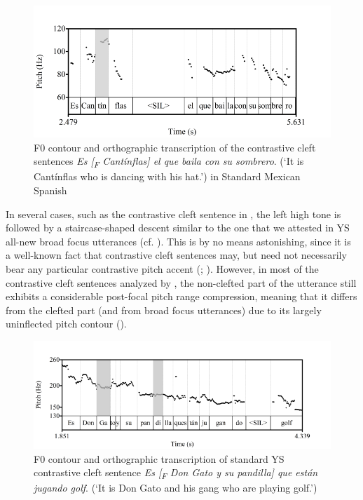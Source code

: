 \documentclass[output=paper]{langsci/langscibook}
\begin{document}
\begin{figure}
\includegraphics[width=\textwidth]{figures/UTH-img32.png}
 \caption{F0 contour and orthographic transcription of the contrastive cleft sentences 
 \textit{Es [\textsubscript{F} Cantínflas] el que baila con su sombrero}. 
 (‘It is Cantínflas who is dancing with his hat.’) in Standard Mexican Spanish}
\label{fig:uth:10}
\end{figure}

In several cases, such as the contrastive cleft sentence in , the left high tone is followed by a staircase-shaped descent similar to the one that we attested in YS all-new broad focus utterances (cf. \citealt{Uth16}). This is by no means astonishing, since it is a well-known fact that contrastive cleft sentences may, but need not necessarily bear any particular contrastive pitch accent (\citealt[15]{FeldhausenVanrell2015}; \citealt[4298]{MorenoCabrera99}). However, in most of the contrastive cleft sentences analyzed by \citet{Uth16}, the non-clefted part of the utterance still exhibits a considerable post-focal pitch range compression, meaning that it differs from the clefted part (and from broad focus utterances) due to its largely uninflected pitch contour ().

  

\begin{figure}
\includegraphics[width=\textwidth]{figures/UTH-img33.png}
 \caption{F0 contour and orthographic transcription of standard YS contrastive cleft sentence 
 \textit{Es [\textsubscript{F} Don Gato y su pandilla] que están jugando golf}. 
 (‘It is Don Gato and his gang who are playing golf.')}
\label{fig:uth:11}
\end{figure}
\end{document}
